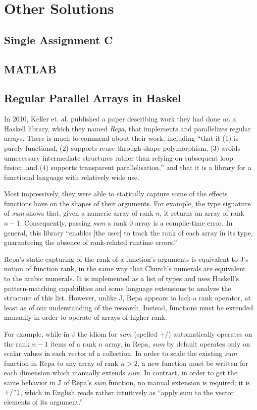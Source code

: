 \section{Other Solutions}
\subsection{Single Assignment C}

\subsection{MATLAB}

\subsection{Regular Parallel Arrays in Haskel}\cite{dph}
In 2010, Keller et. al. published a paper 
describing work they had done on a Haskell library, which they named \textit{Repa}, that implements and parallelizes regular arrays.
There is much to commend about their work, including ``that it (1) is purely
functional, (2) supports reuse through shape polymorphism, (3)
avoids unnecessary intermediate structures rather than relying on
subsequent loop fusion, and (4) supports transparent parallelisation,''
and that it is a library for a functional language with relatively wide use.

Most impressively, they were able to statically capture some of the effects functions have on the shapes of their arguments.
For example, the type signature of \textit{sum} shows that, given a numeric array of rank $n$, 
it returns an array of rank $n-1$.
Consequently, passing \textit{sum} a rank 0 array is a compile-time error.
In general, this library ``enables [the user] to track the rank of each array in its type,
guaranteeing the absence of rank-related runtime errors.''

Repa's static capturing of the rank of a function's arguments is equivalent to J's notion of function rank, 
in the same way that Church's numerals are equivalent to the arabic numerals. 
It is implemented as a list of types and uses Haskell's pattern-matching capabilities and some language extensions 
to analyze the structure of this list.
However, unlike J, Repa appears to lack a rank operator, at least as of our understanding of the research.
Instead, functions must be extended manually in order to operate of arrays of higher rank.

For example, while in J the idiom for \textit{sum} (spelled $+/$) automatically operates on the rank $n-1$ items of a rank $n$ array, 
in Repa, \textit{sum} by default operates only on scalar values in each vector of a collection.
In order to scale the existing \textit{sum} function in Repa to any array of rank $n > 2$, 
a new function must be written for each dimension which manually extends \textit{sum}.
In contrast, in order to get the same behavior in J of Repa's \textit{sum} function, no manual extension is required; 
it is $+/ " 1$, which in English reads rather intuitively as ``apply sum to the vector elements of its argument.''

